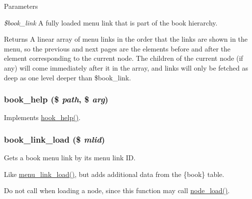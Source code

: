 \begin{DoxyParams}{Parameters}
\item[{\em \$book\_\-link}]A fully loaded menu link that is part of the book hierarchy.\end{DoxyParams}
\begin{DoxyReturn}{Returns}
A linear array of menu links in the order that the links are shown in the menu, so the previous and next pages are the elements before and after the element corresponding to the current node. The children of the current node (if any) will come immediately after it in the array, and links will only be fetched as deep as one level deeper than \$book\_\-link. 
\end{DoxyReturn}
\hypertarget{book_8module_a48d0c1249b50c523908ea933d0953bca}{
\subsubsection[{book\_\-help}]{\setlength{\rightskip}{0pt plus 5cm}book\_\-help (\$ {\em path}, \/  \$ {\em arg})}}
\label{book_8module_a48d0c1249b50c523908ea933d0953bca}
Implements \hyperlink{group__hooks_ga5589c2714a782738e8851c4c90231f0e}{hook\_\-help()}. \hypertarget{book_8module_a996cf515cb6eb772f4190c144016c2bb}{
\subsubsection[{book\_\-link\_\-load}]{\setlength{\rightskip}{0pt plus 5cm}book\_\-link\_\-load (\$ {\em mlid})}}
\label{book_8module_a996cf515cb6eb772f4190c144016c2bb}
Gets a book menu link by its menu link ID.

Like \hyperlink{group__menu_gac2b338fa3a449c826661aade7a7d486e}{menu\_\-link\_\-load()}, but adds additional data from the \{book\} table.

Do not call when loading a node, since this function may call \hyperlink{node_8module_a492ddfc12843e71242bb484a44e51a19}{node\_\-load()}.


